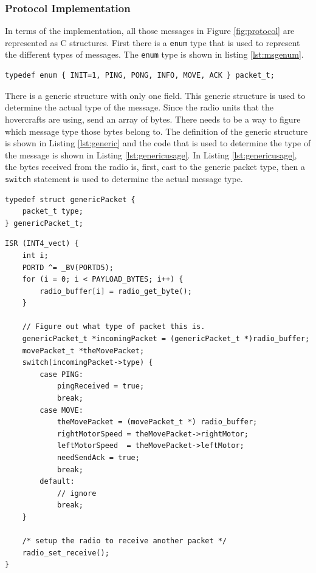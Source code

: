 \subsubsection{Protocol Implementation}
In terms of the implementation, all those messages in Figure \ref{fig:protocol}
are represented as C structures. First there is a \texttt{enum} type that is
used to represent the different types of messages. The \texttt{enum} type is
shown in listing \ref{lst:msgenum}.
\begin{lstlisting}[caption={Enumerations for message types},
                   label=lst:msgenum]
typedef enum { INIT=1, PING, PONG, INFO, MOVE, ACK } packet_t;
\end{lstlisting}
There is a generic structure with only one field. This generic structure is used
to determine the actual type of the message. Since the radio units that the
hovercrafts are using, send an array of bytes. There needs to be a way to figure
which message type those bytes belong to. The definition of the generic
structure is shown in Listing \ref{lst:generic} and the code that is used to
determine the type of the message is shown in Listing \ref{lst:genericusage}. In
Listing \ref{lst:genericusage}, the bytes received from the radio is, first,
cast to the generic packet type, then a \texttt{switch} statement is used to
determine the actual message type.
\begin{lstlisting}[label=lst:generic,float,
                   caption={Generic Packet Structure}]
typedef struct genericPacket {
    packet_t type;
} genericPacket_t;
\end{lstlisting}
\begin{lstlisting}[label=lst:genericusage,float,
                   caption={Packets Casting}]
ISR (INT4_vect) {
    int i;
    PORTD ^= _BV(PORTD5);
    for (i = 0; i < PAYLOAD_BYTES; i++) {
        radio_buffer[i] = radio_get_byte();
    }
    
    // Figure out what type of packet this is.
    genericPacket_t *incomingPacket = (genericPacket_t *)radio_buffer;
    movePacket_t *theMovePacket;
    switch(incomingPacket->type) {
        case PING:
            pingReceived = true;
            break;
        case MOVE:
            theMovePacket = (movePacket_t *) radio_buffer;
            rightMotorSpeed = theMovePacket->rightMotor;
            leftMotorSpeed  = theMovePacket->leftMotor;
            needSendAck = true;
            break;
        default:
            // ignore
            break;
    }
    
    /* setup the radio to receive another packet */
    radio_set_receive();
}
\end{lstlisting}
